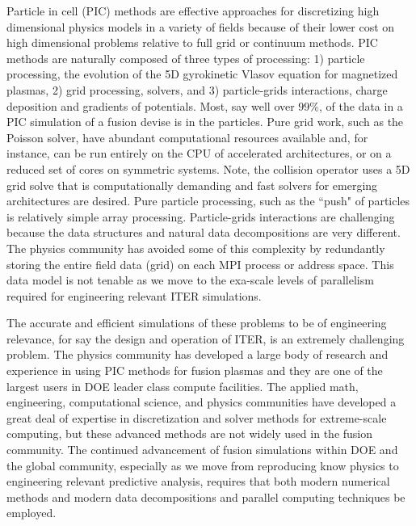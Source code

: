 \documentclass[review]{siamart}
\begin{document}
Particle in cell (PIC) methods are effective approaches for discretizing high dimensional physics models in a variety of fields because of their lower cost on high dimensional problems relative to full grid or continuum methods.
PIC methods are naturally composed of three types of processing: 1) particle processing, the evolution of the 5D gyrokinetic Vlasov equation for magnetized plasmas, 2) grid processing, solvers, and 3) particle-grids interactions, charge deposition and gradients of potentials.
Most, say well over $99\%$, of the data in a PIC simulation of a fusion devise is in the particles.
Pure grid work, such as the Poisson solver, have abundant computational resources available and, for instance, can be run entirely on the CPU of accelerated architectures, or on a reduced set of cores on symmetric systems.
Note, the collision operator uses a 5D grid solve that is computationally demanding and fast solvers for emerging architectures are desired.
Pure particle processing, such as the ``push" of particles is relatively simple array processing.
Particle-grids interactions are challenging because the data structures and natural data decompositions are very different.
The physics community has avoided some of this complexity by redundantly storing the entire field data (grid) on each MPI process or address space.
This data model is not tenable as we move to the exa-scale levels of parallelism required for engineering relevant ITER simulations.

The accurate and efficient simulations of these problems to be of engineering relevance, for say the design and operation of ITER, is an extremely challenging problem.
The physics community has developed a large body of research and experience in using PIC methods for fusion plasmas and they are one of the largest users in DOE leader class compute facilities.
The applied math, engineering, computational science, and physics communities have developed a great deal of expertise in discretization and solver methods for extreme-scale computing, but these advanced methods are not widely used in the fusion community.
The continued advancement of fusion simulations within DOE and the global community, especially as we move from reproducing know physics to engineering relevant predictive analysis, requires that both modern numerical methods and modern data decompositions and parallel computing techniques be employed.
\end{document}
